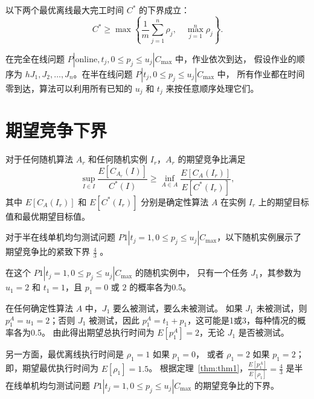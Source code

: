 \begin{lem}
\label{lem5}
以下两个最优离线最大完工时间 \( C^* \) 的下界成立：
\begin{equation}
\label{equ:equ4}
C^* \geq \max \left\{
\frac{1}{m} \sum_{j=1}^n \rho_j, \quad \max_{j=1}^n \rho_j
\right\}. 
\end{equation}
\end{lem}

在完全在线问题 \( P | \text{online}, t_j, 0 \leq p_j \leq u_j | C_{\text{max}} \) 中，作业依次到达，
假设作业的顺序为 \( hJ_1, J_2, \dots, J_n \)。在半在线问题 \( P | t_j , 0 \leq p_j \leq u_j | C_{\text{max}} \) 中，
所有作业都在时间零到达，算法可以利用所有已知的 \( u_j \) 和 \( t_j \) 来按任意顺序处理它们。

\section{期望竞争下界}

\begin{thm}
    \label{thm:thm1}
    对于任何随机算法 \( A_r \) 和任何随机实例 \( I_r \)，\( A_r \) 的期望竞争比满足
    \[
    \sup_{I \in I} \frac{E[C_{A_r}(I)]}{C^*(I)} \geq \inf_{A \in A} \frac{E[C_A(I_r)]}{E[C^*(I_r)]},
    \]
    其中 \( E[C_A(I_r)] \) 和 \( E[C^*(I_r)] \) 分别是确定性算法 \( A \) 在实例 \( I_r \) 上的期望目标值和最优期望目标值。
\end{thm}

对于半在线单机均匀测试问题 \( P1 | t_j = 1, 0 \leq p_j \leq u_j | C_{\max} \)，以下随机实例展示了期望竞争比的紧致下界 \(\frac{4}{3}\)
\cite{durr2018scheduling}\cite{durr2020adversarial}\cite{albers2021explorable}。

\begin{exm}
    \label{exm1}
    在这个 \( P1 | t_j = 1, 0 \leq p_j \leq u_j | C_{\max} \) 的随机实例中，
    只有一个任务 \( J_1 \)，其参数为 \( u_1 = 2 \) 和 \( t_1 = 1 \)，且 \( p_1 = 0 \) 或 \( 2 \) 的概率各为0.5。

    在任何确定性算法 \( A \) 中，\( J_1 \) 要么被测试，要么未被测试。
    如果 \( J_1 \) 未被测试，则 \( p^A_1 = u_1 = 2 \)；否则 \( J_1 \) 被测试，因此 \( p^A_1 = t_1 + p_1 \)，这可能是1或3，每种情况的概率各为0.5。
    由此得出期望总执行时间为 \( E[p^A_1] = 2 \)，无论 \( J_1 \) 是否被测试。
    
    另一方面，最优离线执行时间是 \( \rho_1 = 1 \) 如果 \( p_1 = 0 \)，
    或者 \( \rho_1 = 2 \) 如果 \( p_1 = 2 \)；即，期望最优执行时间为 \( E[\rho_1] = 1.5 \)。
    根据定理~\ref{thm:thm1}，\( \frac{E[p^A_1]}{E[\rho_1]} = \frac{4}{3} \) 是半在线单机均匀测试问题 \( P1 | t_j = 1, 0 \leq p_j \leq u_j | C_{\max} \) 的期望竞争比的下界。    
\end{exm}

